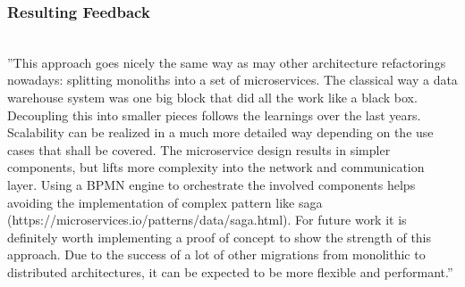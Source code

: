 \subsubsection{Resulting Feedback}
\cite{dirk}\newline
\\
''This approach goes nicely the same way as may other architecture refactorings nowadays: splitting monoliths into a set of microservices. The classical way a data warehouse system was one big block that did all the work like a black box. Decoupling this into smaller pieces follows the learnings over the last years. Scalability can be realized in a much more detailed way depending on the use cases that shall be covered.\newline
The microservice design results in simpler components, but lifts more complexity into the network and communication layer. Using a BPMN engine to orchestrate the involved components helps avoiding the implementation of complex pattern like saga (https://microservices.io/patterns/data/saga.html).\newline
For future work it is definitely worth implementing a proof of concept to show the strength of  this approach. Due to the success of a lot of other migrations from monolithic to distributed architectures, it can be expected to be more flexible and performant.'' \cite{hanno}